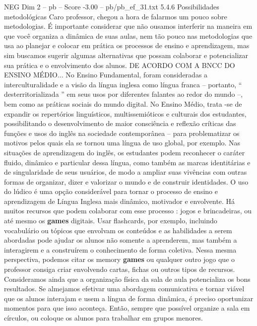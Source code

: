 \begin{textsample}{NEG Dim 2 – pb – Score -3.00 – pb/pb\_ef\_31.txt}  \label{ex:f2_neg_003}
5.4.6 Possibilidades metodológicas Caro professor, chegou a hora de falarmos um pouco sobre metodologias.
É importante considerar que não ousamos interferir na maneira em que você organiza a dinâmica de suas aulas, nem tão pouco nas metodologias que usa ao planejar e colocar em prática os processos de ensino e aprendizagem, mas sim buscamos sugerir algumas alternativas que possam colaborar e potencializar sua prática e o envolvimento dos alunos.
DE ACORDO COM A BNCC DO ENSINO MÉDIO...
No Ensino Fundamental, foram consideradas a interculturalidade e a visão da língua inglesa como língua franca – portanto, “ desterritorializada ” em seus usos por diferentes falantes ao redor do mundo –, bem como as práticas sociais do mundo digital.
No Ensino Médio, trata -se de expandir os repertórios linguísticos, multissemióticos e culturais dos estudantes, possibilitando o desenvolvimento de maior consciência e reflexão críticas das funções e usos do inglês na sociedade contemporânea – para problematizar os motivos pelos quais ela se tornou uma língua de uso global, por exemplo.
Nas situações de aprendizagem do inglês, os estudantes podem reconhecer o caráter fluido, dinâmico e particular dessa língua, como também as marcas identitárias e de singularidade de seus usuários, de modo a ampliar suas vivências com outras formas de organizar, dizer e valorizar o mundo e de construir identidades.
O uso do lúdico é uma opção considerável para tornar o processo de ensino e aprendizagem de Língua Inglesa mais dinâmico, motivador e envolvente.
Há muitos recursos que podem colaborar com esse processo : jogos e brincadeiras, ou até mesmo os \textbf{games} digitais.
Usar flashcards, por exemplo, incluindo vocabulário ou tópicos que envolvam os conteúdos e as habilidades a serem abordadas pode ajudar os alunos não somente a aprenderem, mas também a interagirem e a construírem o conhecimento de forma coletiva.
Nessa mesma perspectiva, podemos citar os memory \textbf{games} ou qualquer outro jogo que o professor consiga criar envolvendo cartas, fichas ou outros tipos de recursos.
Consideramos ainda que a organização física da sala de aula potencializa os bons resultados.
Se almejamos efetivar uma abordagem comunicativa e tornar viável que os alunos interajam e usem a língua de forma dinâmica, é preciso oportunizar momentos para que isso aconteça.
Então, sempre que possível organize a sala em círculos, ou coloque os alunos para trabalhar em grupos menores.

\end{textsample}
